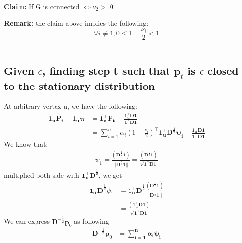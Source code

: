 \documentclass[11pt]{article}
\begin{document}
\textbf{Claim:} If G is connected $\Leftrightarrow \nu_2 >$ 0

\textbf{Remark:} the claim above implies the following:\\
$$\forall i \neq 1, 0\leq 1 - \frac{\nu_i}{2} < 1$$\\

\subsection{Given $\epsilon$, finding step t such that $\mathbf{p}_t$ is $\epsilon$ closed to the stationary distribution}
At arbitrary vertex u, we have the following:
\begin{equation}
\begin{split}
 \mathbf{1_u^\top P_t - 1_u^\top \pi }& \mathbf{= 1_u^\top P_t - \frac{1^\top _uD1}{1^\top D1}}\\
         &= \sum_{i=1}^{n}\alpha_i(1-\frac{\nu_i}{2})^\top \mathbf{1_u^\top D^{\frac{1}{2}}\psi_i-\frac{1^\top _uD1}{1^\top D1}}
\end{split}
\end{equation}
We know that:\\
\begin{equation*}
    \begin{split}
         \psi_1 = \frac{(\mathbf{D}^{\frac{1}{2}}\mathbf{1})}{||\mathbf{D}^{\frac{1}{2}}\mathbf{1}||} = \frac{(\mathbf{D}^{\frac{1}{2}}\mathbf{1})}{\sqrt{\mathbf{1}^\top \mathbf{D1}}}
    \end{split}
\end{equation*}
multiplied both side with $\mathbf{1_u^\top D}^{\frac{1}{2}}$, we get
\begin{equation}
    \begin{split}
         \mathbf{1_u^\top D}^{\frac{1}{2}}\psi_1 
         &\mathbf{= 1_u^\top D}^{\frac{1}{2}}\frac{(\mathbf{D}^{\frac{1}{2}}\mathbf{1})}{||\mathbf{D}^{\frac{1}{2}}\mathbf{1||} }\\
         &\mathbf{= \frac{(1_u^\top D1)}{\sqrt{1^\top D1}}}
    \end{split}
\end{equation}
We can express $\mathbf{D}^{-\frac{1}{2}}\mathbf{p}_0$ as following
\begin{equation*}
    \begin{split}
         \mathbf{D}^{-\frac{1}{2}}\mathbf{p}_0 &\mathbf{= \sum_{i=1}^{n}\alpha_i\psi_i}\\
    \end{split}
\end{equation*}
\end{document}

